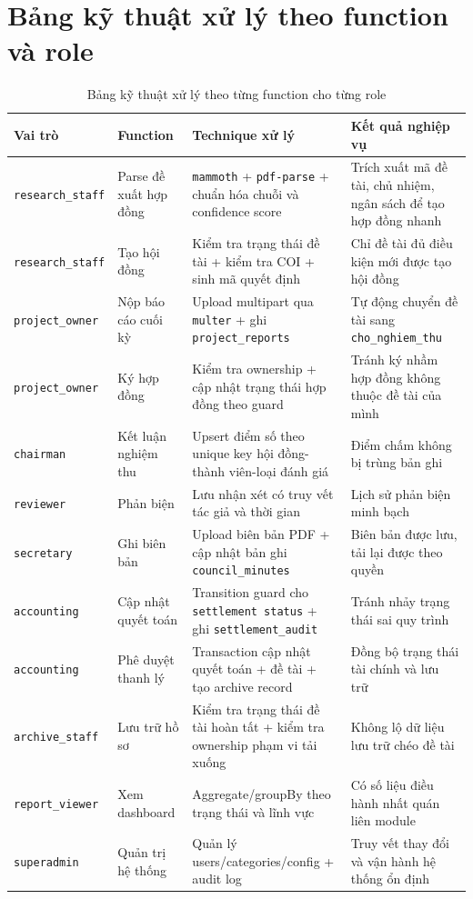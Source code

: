 \documentclass[12pt,a4paper]{report}
\begin{document}
\section{Bảng kỹ thuật xử lý theo function và role}
\begin{table}[H]
\centering
\small
\begin{tabular}{|L{3.0cm}|L{2.6cm}|L{4.0cm}|L{4.4cm}|}
\hline
\textbf{Vai trò} & \textbf{Function} & \textbf{Technique xử lý} & \textbf{Kết quả nghiệp vụ} \\ \hline
\texttt{research\_staff} & Parse đề xuất hợp đồng & \texttt{mammoth} + \texttt{pdf-parse} + chuẩn hóa chuỗi và confidence score & Trích xuất mã đề tài, chủ nhiệm, ngân sách để tạo hợp đồng nhanh \\ \hline
\texttt{research\_staff} & Tạo hội đồng & Kiểm tra trạng thái đề tài + kiểm tra COI + sinh mã quyết định & Chỉ đề tài đủ điều kiện mới được tạo hội đồng \\ \hline
\texttt{project\_owner} & Nộp báo cáo cuối kỳ & Upload multipart qua \texttt{multer} + ghi \texttt{project\_reports} & Tự động chuyển đề tài sang \texttt{cho\_nghiem\_thu} \\ \hline
\texttt{project\_owner} & Ký hợp đồng & Kiểm tra ownership + cập nhật trạng thái hợp đồng theo guard & Tránh ký nhầm hợp đồng không thuộc đề tài của mình \\ \hline
\texttt{chairman} & Kết luận nghiệm thu & Upsert điểm số theo unique key hội đồng-thành viên-loại đánh giá & Điểm chấm không bị trùng bản ghi \\ \hline
\texttt{reviewer} & Phản biện & Lưu nhận xét có truy vết tác giả và thời gian & Lịch sử phản biện minh bạch \\ \hline
\texttt{secretary} & Ghi biên bản & Upload biên bản PDF + cập nhật bản ghi \texttt{council\_minutes} & Biên bản được lưu, tải lại được theo quyền \\ \hline
\texttt{accounting} & Cập nhật quyết toán & Transition guard cho \texttt{settlement status} + ghi \texttt{settlement\_audit} & Tránh nhảy trạng thái sai quy trình \\ \hline
\texttt{accounting} & Phê duyệt thanh lý & Transaction cập nhật quyết toán + đề tài + tạo archive record & Đồng bộ trạng thái tài chính và lưu trữ \\ \hline
\texttt{archive\_staff} & Lưu trữ hồ sơ & Kiểm tra trạng thái đề tài hoàn tất + kiểm tra ownership phạm vi tải xuống & Không lộ dữ liệu lưu trữ chéo đề tài \\ \hline
\texttt{report\_viewer} & Xem dashboard & Aggregate/groupBy theo trạng thái và lĩnh vực & Có số liệu điều hành nhất quán liên module \\ \hline
\texttt{superadmin} & Quản trị hệ thống & Quản lý users/categories/config + audit log & Truy vết thay đổi và vận hành hệ thống ổn định \\ \hline
\end{tabular}
\caption{Bảng kỹ thuật xử lý theo từng function cho từng role}
\end{table}
\end{document}
